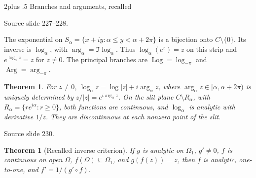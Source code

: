 \documentclass[10pt,letterpaper,twoside,openright]{amsbook}
\makeatletter
\numberwithin{equation}{subsection}
\renewcommand{\section}{\@startsection{section}{1}
 {\z@}{2\baselineskip plus .5\baselineskip}
 {\baselineskip}{\normalfont\Large\bfseries\centering}}
\theoremstyle{sea-plain}
\newtheorem{theorem}[subsection]{Theorem}
\theoremstyle{sea-definition}
\theoremstyle{sea-exercise}
\newcommand{\RR}{\mathbb{R}}
\newcommand{\CC}{\mathbb{C}}
\newcommand{\DD}{\mathbb{D}}
\newcommand{\HH}{\mathbb{H}}
\newcommand{\Chat}{\mathbb{C}_{\infty}}
\def\CC{C}\def\RR{R}\def\DD{D}\def\HH{H}\def\Chat{C infinity}}
\newcommand{\src}[1]{\par\smallskip\noindent
 {\scriptsize\sffamily\color{SoftWhite}Source slide #1.}\par\nopagebreak\smallskip}
\makeatother
\begin{document}
\section{Branches and arguments, recalled}
\src{227--228}
The exponential on $S_\alpha=\{x+iy:\alpha\le y<\alpha+2\pi\}$
is a bijection onto $\CC\setminus\{0\}$. Its inverse is $\log_\alpha$,
with $\arg_\alpha=\Im\log_\alpha$.
Thus $\log_\alpha(e^z)=z$ on this strip and $e^{\log_\alpha z}=z$ for $z\ne0$.
The principal branches are $\operatorname{Log}=\log_{-\pi}$ and
$\operatorname{Arg}=\arg_{-\pi}$.
\begin{theorem}
For $z\ne0$, $\log_\alpha z=\log|z|+i\arg_\alpha z$,
where $\arg_\alpha z\in[\alpha,\alpha+2\pi)$ is uniquely determined by
$z/|z|=e^{i\arg_\alpha z}$.
On the slit plane $\CC\setminus R_\alpha$, with
$R_\alpha=\{re^{i\alpha}:r\ge0\}$, both functions are continuous,
and $\log_\alpha$ is analytic with derivative $1/z$.
They are discontinuous at each nonzero point of the slit.
\end{theorem}
\src{230}
\begin{theorem}[Recalled inverse criterion]
If $g$ is analytic on $\Omega_1$, $g'\ne0$, $f$ is continuous on
open $\Omega$, $f(\Omega)\subseteq\Omega_1$, and $g(f(z))=z$,
then $f$ is analytic, one-to-one, and $f'=1/(g'\circ f)$.
\end{theorem}
\end{document}
